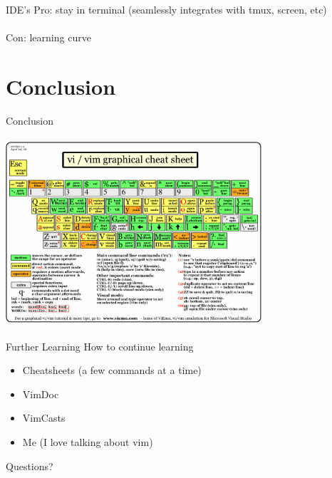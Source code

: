\documentclass{beamer}
\begin{document}
            \begin{frame}{IDE's}
                Pro: stay in terminal (seamlessly integrates with tmux, screen, etc) \\~\\
                \pause
                Con: learning curve
            \end{frame}

    \section*{Conclusion}

            \begin{frame}{Conclusion}
                \begin{center}
                \includegraphics[width = 9.5cm, height = 7cm]{images/vi_vim_cheat_sheet.png}
                \end{center}
            \end{frame}


            \begin{frame}{Further Learning}
                How to continue learning
                \begin{itemize}
                    \item Cheatsheets (a few commands at a time)
                    \item VimDoc
                    \item VimCasts
                    \pause
                    \item Me \pause (I love talking about vim)
                \end{itemize}
            \end{frame}

            \begin{frame}{Questions?}
            \end{frame}
\end{document}
